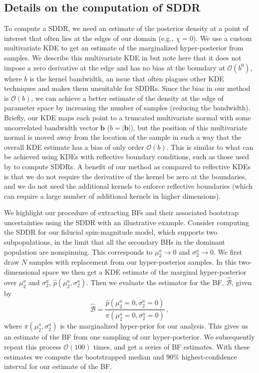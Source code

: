 \documentclass[twocolumn,usenames,dvipsnames,linenumbers]{aastex631}
\begin{document}
\subsection{Details on the computation of SDDR}
\label{sec:SDDRMethods}
To compute a \ac{SDDR}, we need an estimate of the posterior density at a point of interest that often lies at the edges of our domain (e.g., $\chi = 0$). 
We use a custom multivariate \ac{KDE} to get an estimate of the marginalized hyper-posterior from samples. 
We describe this multivariate \ac{KDE} in \cite{TGMM_Methods} but note here that it does not impose a zero derivative at the edge and has no bias at the boundary at $\mathcal O(b^0)$, where $b$ is the kernel bandwidth, an issue that often plagues other \ac{KDE} techniques and makes them unsuitable for \acp{SDDR}.
Since the bias in our method is $\mathcal{O}(b)$, we can achieve a better estimate of the density at the edge of parameter space by increasing the number of samples (reducing the bandwidth).
Briefly, our \ac{KDE} maps each point to a truncated multivariate normal with some uncorrelated bandwidth vector $\mathbf{b}$ ($b = |\mathbf{b}|$), but the position of this multivariate normal is moved away from the location of the sample in such a way that the overall \ac{KDE} estimate has a bias of only order $\mathcal{O}(b)$. 
This is similar to what can be achieved using \acp{KDE} with reflective boundary conditions, such as those used by \cite{Callister:2022qwb} to compute \acp{SDDR}.
A benefit of our method as compared to reflective \acp{KDE} is that we do not require the derivative of the kernel be zero at the boundaries, and we do not need the additional kernels to enforce reflective boundaries (which can require a large number of additional kernels in higher dimensions).

We highlight our procedure of extracting \acp{BF} and their associated bootstrap uncertainties using the \ac{SDDR} with an illustrative example. 
Consider computing the \ac{SDDR} for our fiducial spin-magnitude model, which supports two subpopulations, in the limit that all the secondary \acp{BH} in the dominant population are nonspinning. 
This corresponds to $\mu^a_2 \to 0$  and $\sigma^a_2 \to 0$. 
We first draw $N$ samples with replacement  from our hyper-posterior samples. 
In this two-dimensional space we then get a \ac{KDE} estimate of the marginal hyper-posterior over $\mu^a_2 $ and $\sigma^a_2$, $\hat{p}(\mu^a_2,\sigma^a_2)$. Then we evaluate the estimator for the \ac{BF}, $\hat{\mathcal{B}}$, given by
\begin{equation}
	 \hat{\mathcal B} = \frac{\hat{p}(\mu^a_2=0,\sigma^a_2=0)}{\pi(\mu^a_2=0,\sigma^a_2=0)}\,,
\end{equation}
where $\pi(\mu^a_2,\sigma^a_2)$ is the marginalized hyper-prior for our analysis. 
This gives us an estimate of the \ac{BF} from one sampling of our hyper-posterior. 
We subsequently repeat this process $\mathcal{O}(100)$ times, and get a series of \ac{BF} estimates. 
With these estimates we compute the bootstrapped median and $90\%$ highest-confidence interval for our estimate of the \ac{BF}.
\end{document}

